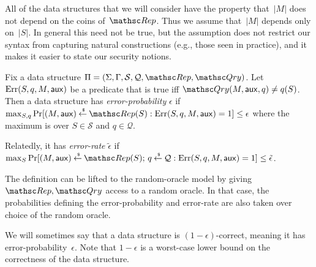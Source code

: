 All of the data structures that we will consider have the property that~$|M|$ does not depend on the coins of~$\Rep$. Thus we assume that~$|M|$ depends only on~$|S|$.  In general this need not be true, but the assumption does not restrict our syntax from capturing natural constructions (e.g., those seen in practice), and it makes it easier to state our security notions.

\begin{definition} \rm
Fix a data structure $\setprim=(\Sigma,\Gamma,\calS,\calQ,\Rep, \Qry)$.
Let $\mathrm{Err}(S,q,M,{\sf aux})$ be a predicate that is true iff $\Qry(M, \aux, q) \neq q(S)$.  Then a data structure
has \emph{error-probability} $\epsilon$ if
$\max_{S,q}\Pr[(M,\aux) \getsr \Rep(S) : \mathrm{Err}(S,q,M,\aux)=1 ] \leq \epsilon$
where the maximum is over $S \in \mathcal{S}$ and $q \in \mathcal{Q}$.  

Relatedly, it has \emph{error-rate} $\tilde{\epsilon}$ if
$\max_{S}\Pr[(M,\aux) \getsr \Rep(S);\, q \getsr \calQ : \mathrm{Err}(S,q,M,\aux)=1] \leq \tilde{\epsilon}$.
\hfill\dqed
\end{definition}

\noindent
The definition can be lifted to the random-oracle model
by giving $\Rep, \Qry$ access to a random oracle. In that case,
the probabilities defining the error-probability and error-rate are also taken over choice of the random oracle.

We will sometimes say that a data structure is $(1-\epsilon)$-correct, meaning it has error-probability~$\epsilon$.  Note that $1-\epsilon$ is a worst-case lower bound on the correctness of the data structure.


